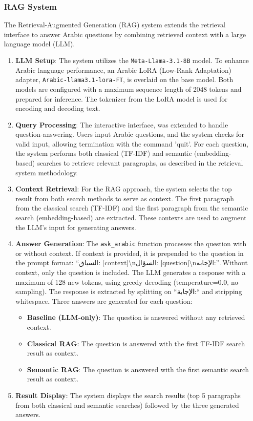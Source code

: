 \documentclass[12pt]{article}
\begin{document}
\subsubsection{RAG System}

The Retrieval-Augmented Generation (RAG) system extends the retrieval interface to answer Arabic questions by combining retrieved context with a large language model (LLM).


\begin{enumerate}
    \item \textbf{LLM Setup}: The system utilizes the \texttt{Meta-Llama-3.1-8B} model. To enhance Arabic language performance, an Arabic LoRA (Low-Rank Adaptation) adapter, \texttt{Arabic-llama3.1-lora-FT}, is overlaid on the base model. Both models are configured with a maximum sequence length of 2048 tokens and prepared for inference. The tokenizer from the LoRA model is used for encoding and decoding text.
    
    \item \textbf{Query Processing}: The interactive interface, was extended to handle question-answering. Users input Arabic questions, and the system checks for valid input, allowing termination with the command 'quit'. For each question, the system performs both classical (TF-IDF) and semantic (embedding-based) searches to retrieve relevant paragraphs, as described in the retrieval system methodology.
    
    \item \textbf{Context Retrieval}: For the RAG approach, the system selects the top result from both search methods to serve as context. The first paragraph from the classical search (TF-IDF) and the first paragraph from the semantic search (embedding-based) are extracted. These contexts are used to augment the LLM’s input for generating answers.
    
    \item \textbf{Answer Generation}: The \texttt{ask\_arabic} function processes the question with or without context. If context is provided, it is prepended to the question in the prompt format: ``السياق: [context]\textbackslash nالسؤال: [question]\textbackslash nالإجابة:''. Without context, only the question is included. The LLM generates a response with a maximum of 128 new tokens, using greedy decoding (temperature=0.0, no sampling). The response is extracted by splitting on ``الإجابة:`` and stripping whitespace. Three answers are generated for each question:
    \begin{itemize}
        \item \textbf{Baseline (LLM-only)}: The question is answered without any retrieved context.
        \item \textbf{Classical RAG}: The question is answered with the first TF-IDF search result as context.
        \item \textbf{Semantic RAG}: The question is answered with the first semantic search result as context.
    \end{itemize}
    
    \item \textbf{Result Display}: The system displays the search results (top 5 paragraphs from both classical and semantic searches) followed by the three generated answers.
\end{enumerate}
\end{document}
